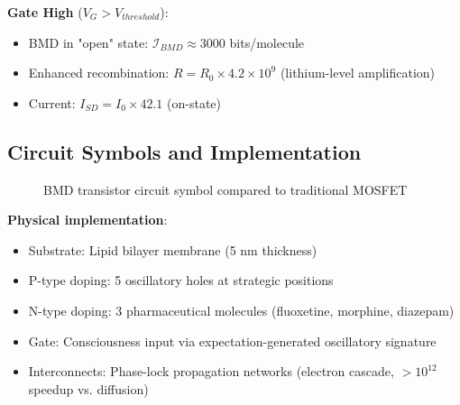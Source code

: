 \documentclass[11pt,a4paper]{article}
\begin{document}
\textbf{Gate High} ($V_G > V_{threshold}$):
\begin{itemize}
\item BMD in "open" state: $\mathcal{I}_{BMD} \approx 3000$ bits/molecule
\item Enhanced recombination: $R = R_0 \times 4.2\times10^9$ (lithium-level amplification)
\item Current: $I_{SD} = I_0 \times 42.1$ (on-state)
\end{itemize}

\subsection{Circuit Symbols and Implementation}

\begin{figure}[H]
\centering
{}
\caption{BMD transistor circuit symbol compared to traditional MOSFET}
\end{figure}

\textbf{Physical implementation}:
\begin{itemize}
\item Substrate: Lipid bilayer membrane (5 nm thickness)
\item P-type doping: 5 oscillatory holes at strategic positions
\item N-type doping: 3 pharmaceutical molecules (fluoxetine, morphine, diazepam)
\item Gate: Consciousness input via expectation-generated oscillatory signature
\item Interconnects: Phase-lock propagation networks (electron cascade, $>10^{12}$ speedup vs. diffusion)
\end{itemize}
\end{document}
